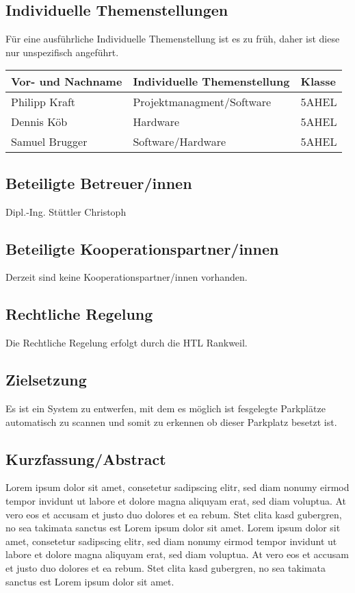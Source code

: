 \documentclass[11pt]{article}
\begin{document}
\subsection{Individuelle Themenstellungen}
Für eine ausführliche Individuelle Themenstellung ist es zu früh, daher ist diese nur unspezifisch angeführt.

\begin{table}[htb]
  \begin{tabular}{|l|l|l|}
    \hline
    \textbf{Vor- und Nachname} & \textbf{Individuelle Themenstellung} & \textbf{Klasse} \\ \hline
    Philipp Kraft              & Projektmanagment/Software            & 5AHEL           \\ \hline
    Dennis Köb                 & Hardware                             & 5AHEL           \\ \hline
    Samuel Brugger             & Software/Hardware                    & 5AHEL           \\ \hline
  \end{tabular}
\end{table}

\subsection{Beteiligte Betreuer/innen}
Dipl.-Ing. Stüttler Christoph 

\subsection{Beteiligte Kooperationspartner/innen}
Derzeit sind keine Kooperationspartner/innen vorhanden.

\subsection{Rechtliche Regelung}
Die Rechtliche Regelung erfolgt durch die HTL Rankweil.

\subsection{Zielsetzung}
Es ist ein System zu entwerfen, mit dem es möglich ist fesgelegte Parkplätze automatisch zu scannen und somit zu erkennen ob dieser Parkplatz besetzt ist.

\subsection{Kurzfassung/Abstract}
Lorem ipsum dolor sit amet, consetetur sadipscing elitr, sed diam nonumy eirmod tempor invidunt ut labore et dolore magna aliquyam erat, sed diam voluptua. At vero eos et accusam et justo duo dolores et ea rebum. Stet clita kasd gubergren, no sea takimata sanctus est Lorem ipsum dolor sit amet. Lorem ipsum dolor sit amet, consetetur sadipscing elitr, sed diam nonumy eirmod tempor invidunt ut labore et dolore magna aliquyam erat, sed diam voluptua. At vero eos et accusam et justo duo dolores et ea rebum. Stet clita kasd gubergren, no sea takimata sanctus est Lorem ipsum dolor sit amet.
\end{document}
